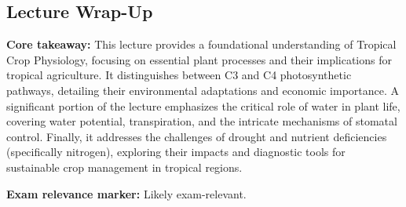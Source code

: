 \subsection*{Lecture Wrap-Up} 
\textbf{Core takeaway:} This lecture provides a foundational understanding of Tropical Crop Physiology, focusing on essential plant processes and their implications for tropical agriculture. It distinguishes between C3 and C4 photosynthetic pathways, detailing their environmental adaptations and economic importance. A significant portion of the lecture emphasizes the critical role of water in plant life, covering water potential, transpiration, and the intricate mechanisms of stomatal control. Finally, it addresses the challenges of drought and nutrient deficiencies (specifically nitrogen), exploring their impacts and diagnostic tools for sustainable crop management in tropical regions. 

\vspace{1em} 
\textbf{Exam relevance marker:} Likely exam-relevant.